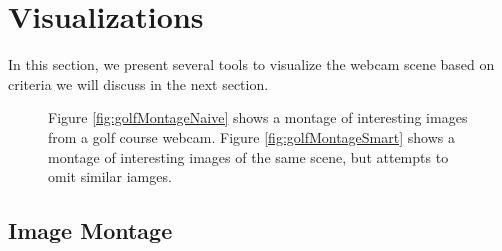 \section{Visualizations}

In this section, we present several tools to visualize the webcam scene based on criteria we will discuss in the next section.

\begin{figure}
	\centering
		\caption[Focusing on object edges with gradient magnitude images.]{Figure \ref{fig:golfMontageNaive} shows a montage of interesting images from a golf course webcam. Figure \ref{fig:golfMontageSmart} shows a montage of interesting images of the same scene, but attempts to omit similar iamges.}
\end{figure}

\subsection{Image Montage}

